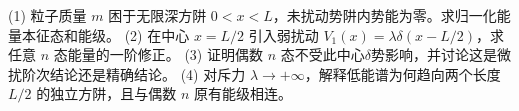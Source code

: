 (1) 粒子质量 \(m\) 困于无限深方阱 \(0<x<L\)，未扰动势阱内势能为零。求归一化能量本征态和能级。
(2) 在中心 \(x=L/2\) 引入弱扰动 \(V_1(x)=\lambda\delta(x-L/2)\)，求任意 \(n\) 态能量的一阶修正。
(3) 证明偶数 \(n\) 态不受此中心\(\delta \)势影响，并讨论这是微扰阶次结论还是精确结论。
(4) 对斥力 \(\lambda\to+\infty\)，解释低能谱为何趋向两个长度 \(L/2\) 的独立方阱，且与偶数 \(n\) 原有能级相连。
